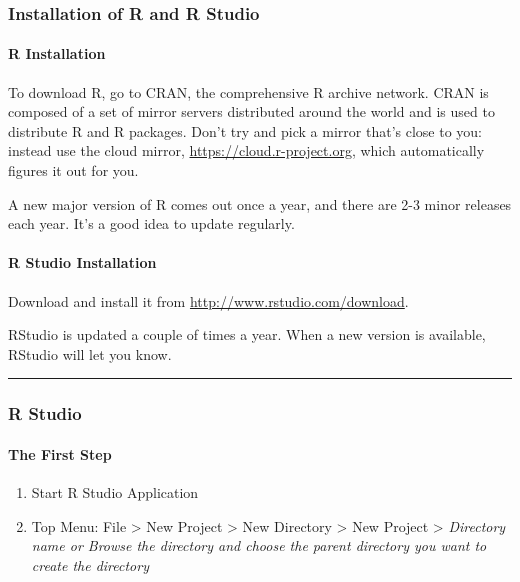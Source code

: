 \documentclass[
]{article}
\providecommand{\tightlist}{%
  \setlength{\itemsep}{0pt}\setlength{\parskip}{0pt}}
\begin{document}
\hypertarget{installation-of-r-and-r-studio}{%
\subsubsection{Installation of R and R
Studio}\label{installation-of-r-and-r-studio}}

\hypertarget{r-installation}{%
\paragraph{R Installation}\label{r-installation}}

To download R, go to CRAN, the comprehensive R archive network. CRAN is
composed of a set of mirror servers distributed around the world and is
used to distribute R and R packages. Don't try and pick a mirror that's
close to you: instead use the cloud mirror,
\url{https://cloud.r-project.org}, which automatically figures it out
for you.

A new major version of R comes out once a year, and there are 2-3 minor
releases each year. It's a good idea to update regularly.

\hypertarget{r-studio-installation}{%
\paragraph{R Studio Installation}\label{r-studio-installation}}

Download and install it from \url{http://www.rstudio.com/download}.

RStudio is updated a couple of times a year. When a new version is
available, RStudio will let you know.

\begin{center}\rule{0.5\linewidth}{0.5pt}\end{center}

\hypertarget{r-studio}{%
\subsubsection{R Studio}\label{r-studio}}

\hypertarget{the-first-step}{%
\paragraph{The First Step}\label{the-first-step}}

\begin{enumerate}
\def\labelenumi{\arabic{enumi}.}
\tightlist
\item
  Start R Studio Application
\item
  Top Menu: File \textgreater{} New Project \textgreater{} New Directory
  \textgreater{} New Project \textgreater{} \emph{Directory name or
  Browse the directory and choose the parent directory you want to
  create the directory}
\end{enumerate}
\end{document}
